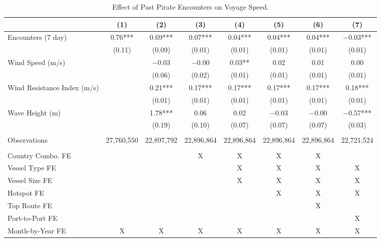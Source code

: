\begin{table}
\centering
\caption{Effect of Past Pirate Encounters on Voyage Speed. \label{tab:spec-speed-table-rev}}
\centering
\begin{adjustbox}{width = .9\textwidth}
\begin{threeparttable}
\begin{tabular}[t]{lccccccc}
\toprule
  & (1) & (2) & (3) & (4) & (5) & (6) & (7)\\
\midrule
Encounters (7 day) & \num{0.76}*** & \num{0.69}*** & \num{0.07}*** & \num{0.04}*** & \num{0.04}*** & \num{0.04}*** & \num{-0.03}***\\
 & (\num{0.11}) & (\num{0.09}) & (\num{0.01}) & (\num{0.01}) & (\num{0.01}) & (\num{0.01}) & (\num{0.01})\\
Wind Speed (m/s) &  & \num{-0.03} & \num{-0.00} & \num{0.03}** & \num{0.02} & \num{0.01} & \num{0.00}\\
 &  & (\num{0.06}) & (\num{0.02}) & (\num{0.01}) & (\num{0.01}) & (\num{0.01}) & (\num{0.01})\\
Wind Resistance Index (m/s) &  & \num{0.21}*** & \num{0.17}*** & \num{0.17}*** & \num{0.17}*** & \num{0.17}*** & \num{0.18}***\\
 &  & (\num{0.01}) & (\num{0.01}) & (\num{0.01}) & (\num{0.01}) & (\num{0.01}) & (\num{0.01})\\
Wave Height (m) &  & \num{1.78}*** & \num{0.06} & \num{0.02} & \num{-0.03} & \num{-0.00} & \num{-0.57}***\\
 &  & (\num{0.19}) & (\num{0.10}) & (\num{0.07}) & (\num{0.07}) & (\num{0.07}) & (\num{0.03})\\
 &  &  &  &  &  &  & \\
Observations & 27,760,550 & 22,897,792 & 22,896,864 & 22,896,864 & 22,896,864 & 22,896,864 & 22,721,524\\
 &  &  &  &  &  &  & \\
Country Combo. FE &  &  & X & X & X & X & \\
Vessel Type FE &  &  &  & X & X & X & X\\
Vessel Size FE &  &  &  & X & X & X & X\\
Hotspot FE &  &  &  &  & X & X & X\\
Top Route FE &  &  &  &  &  & X & \\
Port-to-Port FE &  &  &  &  &  &  & X\\
Month-by-Year FE & X & X & X & X & X & X & X\\
\bottomrule
\end{tabular}
\begin{tablenotes}

\end{tablenotes}
\end{threeparttable}
\end{adjustbox}
\end{table}
